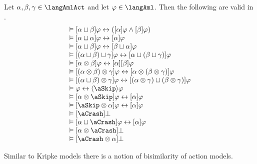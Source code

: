 \begin{proposition}
Let $\alpha, \beta, \gamma \in \langAmlAct$ and let $\phi \in \langAml$. Then the following are valid in \logicAmlC{}.
$$
\begin{array}{l}
    \entails \actionA{\alpha \choice \beta} \phi \iff (\actionA{\alpha} \phi \land \actionA{\beta} \phi) \label{afl-axiom-choice}\\
    \entails \actionA{\alpha \choice \alpha} \phi \iff \actionA{\alpha} \phi\\
    \entails \actionA{\alpha \choice \beta} \phi \iff \actionA{\beta \choice \alpha} \phi\\
    \entails \actionA{(\alpha \choice \beta) \choice \gamma} \phi \iff \actionA{\alpha \choice (\beta \choice \gamma)} \phi\\
    \entails \actionA{\alpha \compose \beta} \phi \iff \actionA{\alpha} \actionA{\beta} \phi \label{afl-axiom-sequential}\\
    \entails \actionA{(\alpha \compose \beta) \compose \gamma} \phi \iff \actionA{\alpha \compose (\beta \compose \gamma)} \phi\\
    \entails \actionA{(\alpha \choice \beta) \compose \gamma} \phi \iff \actionA{(\alpha \compose \gamma) \choice (\beta \compose \gamma)} \phi\\
    \entails \phi \iff \actionE{\aSkip} \phi\\
    \entails \actionA{\alpha \compose \aSkip} \phi \iff \actionA{\alpha} \phi\\
    \entails \actionA{\aSkip \compose \alpha} \phi \iff \actionA{\alpha} \phi\\
    \entails \actionA{\aCrash} \bot\\
    \entails \actionA{\alpha \choice \aCrash} \phi \iff \actionA{\alpha} \phi\\
    \entails \actionA{\alpha \compose \aCrash} \bot\\
    \entails \actionA{\aCrash \compose \alpha} \bot
\end{array}
$$
\end{proposition}

Similar to Kripke models there is a notion of bisimilarity of action models.

